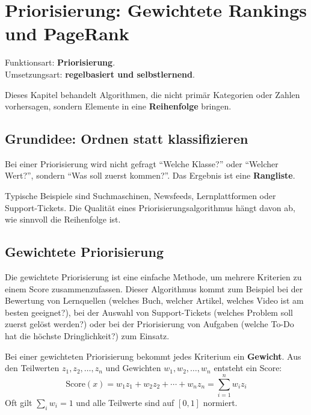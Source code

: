 \chapter{Priorisierung: Gewichtete Rankings und PageRank}
\label{chap:priorisierung}

\begin{myremark}
    Funktionsart: \textbf{Priorisierung}. \\
    Umsetzungsart: \textbf{regelbasiert und selbstlernend}.
\end{myremark}

\begin{myremark}
    Dieses Kapitel behandelt Algorithmen, die nicht primär Kategorien
    oder Zahlen vorhersagen, sondern Elemente in eine \textbf{Reihenfolge} bringen.
\end{myremark}

\section{Grundidee: Ordnen statt klassifizieren}

Bei einer Priorisierung wird nicht gefragt \enquote{Welche Klasse?} oder \enquote{Welcher Wert?},
sondern \enquote{Was soll zuerst kommen?}. Das Ergebnis ist eine \textbf{Rangliste}.

Typische Beispiele sind Suchmaschinen, Newsfeeds, Lernplattformen oder Support-Tickets.
Die Qualität eines Priorisierungsalgorithmus hängt davon ab, wie sinnvoll die Reihenfolge ist.

\section{Gewichtete Priorisierung}
Die gewichtete Priorisierung ist eine einfache Methode, um mehrere Kriterien zu einem Score zusammenzufassen. Dieser Algorithmus kommt zum Beispiel bei der Bewertung von Lernquellen (welches Buch, welcher Artikel, welches Video ist am besten geeignet?), bei der Auswahl von Support-Tickets (welches Problem soll zuerst gelöst werden?) oder bei der Priorisierung von Aufgaben (welche To-Do hat die höchste Dringlichkeit?) zum Einsatz.

\begin{mydefinition}
    Bei einer gewichteten Priorisierung bekommt jedes Kriterium ein \textbf{Gewicht}.
    Aus den Teilwerten $z_1, z_2, \ldots, z_n$ und Gewichten $w_1, w_2, \ldots, w_n$ entsteht ein Score:
    \[
        \text{Score}(x) = w_1 z_1 + w_2 z_2 + \cdots + w_n z_n = \sum_{i=1}^n w_i z_i
    \]
    Oft gilt $\sum_i w_i = 1$ und alle Teilwerte sind auf $[0,1]$ normiert.
\end{mydefinition}

